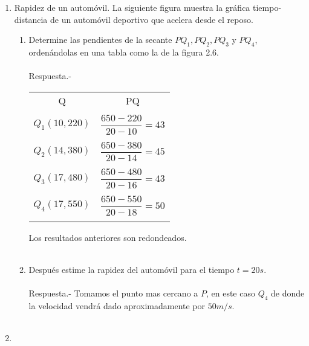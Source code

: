 \begin{enumerate}
\item Rapidez de un automóvil. La siguiente figura muestra la gráfica tiempo-distancia de un automóvil deportivo que acelera desde el reposo.
\begin{enumerate}[\bfseries a)]

    \item Determine las pendientes de la secante $PQ_1, PQ_2, PQ_3$ y $PQ_4$, ordenándolas en una tabla como la de la figura 2.6.\\\\
	Respuesta.-\; 
	\begin{center}
	    \begin{tabular}{c|c}
		Q & PQ \\\\	
		\hline
		$Q_1(10,220)$ & $\dfrac{650-220}{20-10} = 43$\\\\
		$Q_2(14,380)$ & $\dfrac{650-380}{20-14} = 45$\\\\
		$Q_3(17,480)$ & $\dfrac{650-480}{20-16} = 43$\\\\
		$Q_4(17,550)$ & $\dfrac{650-550}{20-18} = 50$\\\\
	    \end{tabular}
	\end{center}
	Los resultados anteriores son redondeados.\\\\

    \item Después estime la rapidez del automóvil para el tiempo $t=20s$.\\\\
	Respuesta.-\; Tomamos el punto mas cercano a $P$, en este caso $Q_4$ de donde la velocidad vendrá dado aproximadamente por $50m/s$.\\\\

\end{enumerate}

\item 

\end{enumerate}
